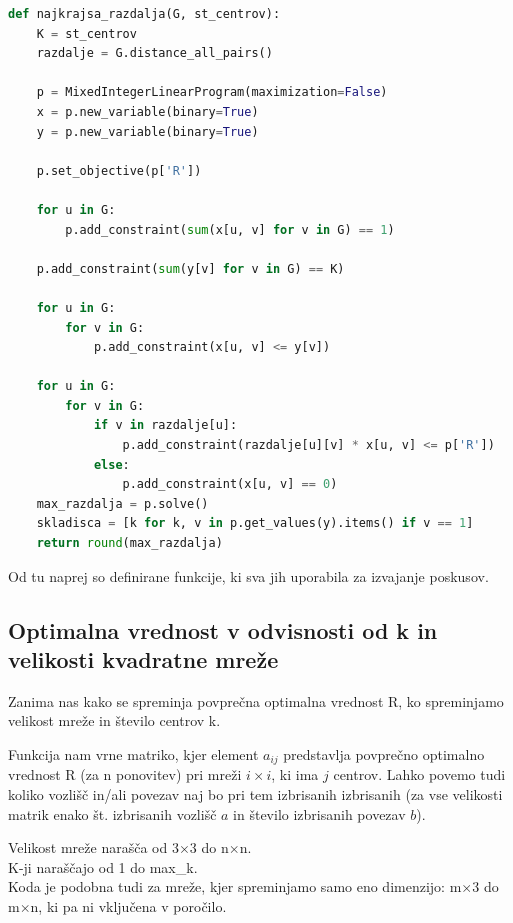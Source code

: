 \documentclass[a4paper]{article}
\begin{document}
\begin{lstlisting}[language=Python]
def najkrajsa_razdalja(G, st_centrov):
    K = st_centrov
    razdalje = G.distance_all_pairs()

    p = MixedIntegerLinearProgram(maximization=False)
    x = p.new_variable(binary=True)
    y = p.new_variable(binary=True)

    p.set_objective(p['R'])

    for u in G:
        p.add_constraint(sum(x[u, v] for v in G) == 1)
       
    p.add_constraint(sum(y[v] for v in G) == K)

    for u in G:
        for v in G:
            p.add_constraint(x[u, v] <= y[v])

    for u in G:
        for v in G:
            if v in razdalje[u]:
                p.add_constraint(razdalje[u][v] * x[u, v] <= p['R'])
            else:
                p.add_constraint(x[u, v] == 0)
    max_razdalja = p.solve()
    skladisca = [k for k, v in p.get_values(y).items() if v == 1]
    return round(max_razdalja)
\end{lstlisting}

Od tu naprej so definirane funkcije, ki sva jih uporabila za izvajanje poskusov.

\subsection{Optimalna vrednost v odvisnosti od k in velikosti kvadratne mreže}
Zanima nas kako se spreminja povprečna optimalna vrednost R, ko spreminjamo velikost mreže in število centrov k.
\par
Funkcija nam vrne matriko, kjer element $a_{ij}$ predstavlja povprečno optimalno vrednost R (za n ponovitev) pri mreži $i \times i$, ki ima $j$ centrov. Lahko povemo tudi koliko vozlišč in/ali povezav naj bo pri tem izbrisanih izbrisanih (za vse velikosti matrik enako št. izbrisanih vozlišč $a$ in število izbrisanih povezav $b$).

\vspace{\baselineskip}

Velikost mreže narašča od 3$\times$3 do n$\times$n.\\
K-ji naraščajo od 1 do max\_k.\\

Koda je podobna tudi za mreže, kjer spreminjamo samo eno dimenzijo: m$\times$3 do m$\times$n, ki pa ni vključena v poročilo.
\end{document}
